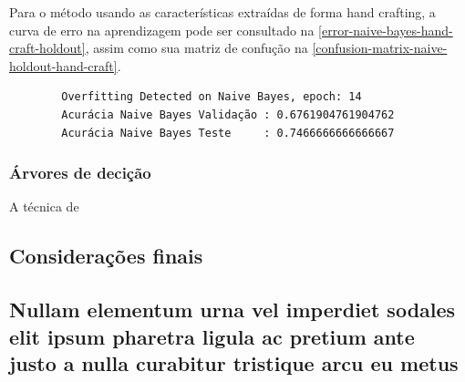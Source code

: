 \documentclass[
article,			%
11pt,				%
oneside,			%
a4paper,			%
english,			%
brazil,				%
sumario=tradicional,
]{abntex2}
\begin{document}
	Para o método usando as características extraídas de forma hand crafting, a curva de erro na aprendizagem pode ser consultado na \autoref{error-naive-bayes-hand-craft-holdout}, assim como sua matriz de confução na \autoref{confusion-matrix-naive-holdout-hand-craft}.
	
	\begin{verbatim}
		Overfitting Detected on Naive Bayes, epoch: 14
		Acurácia Naive Bayes Validação : 0.6761904761904762
		Acurácia Naive Bayes Teste     : 0.7466666666666667
	\end{verbatim}
	
	\subsection{Árvores de decição}
	
	A técnica de
	
	
	
	\section{Considerações finais}
	
	\lipsum[1]
	
	\begin{citacao}
		\lipsum[2]
	\end{citacao}
	
	\lipsum[3]
	
	\postextual
	
	
	
	
	
	\begin{apendicesenv}
		
		\chapter{Nullam elementum urna vel imperdiet sodales elit ipsum pharetra ligula
			ac pretium ante justo a nulla curabitur tristique arcu eu metus}
		\lipsum[55-56]
		
	\end{apendicesenv}
	
\end{document}
